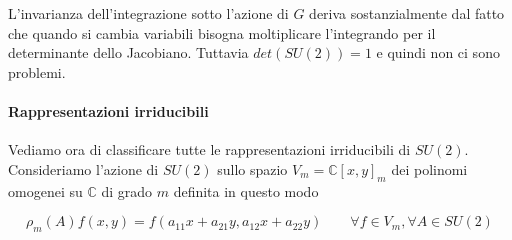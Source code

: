 \documentclass[11pt]{article}
\theoremstyle{plain}
\theoremstyle{definition}
\theoremstyle{remark}
\newcommand{\C}{\mathbb{C}}
\begin{document}
L'invarianza dell'integrazione sotto l'azione di $G$ deriva sostanzialmente dal fatto che quando si cambia variabili bisogna moltiplicare l'integrando per il determinante dello Jacobiano. Tuttavia $det(SU(2)) = 1$ e quindi non ci sono problemi.

\paragraph{Rappresentazioni irriducibili}
Vediamo ora di classificare tutte le rappresentazioni irriducibili di $SU(2)$.
Consideriamo l'azione di $SU(2)$ sullo spazio $V_m = \C[x,y]_m$ dei polinomi omogenei su $\C$ di grado $m$ definita in questo modo

 \[
 \rho_m(A) f(x, y) = f(a_{11} x + a_{21} y , a_{12} x + a_{22} y) \qquad \forall f \in V_m, \forall A \in SU(2)
 \]
\end{document}
